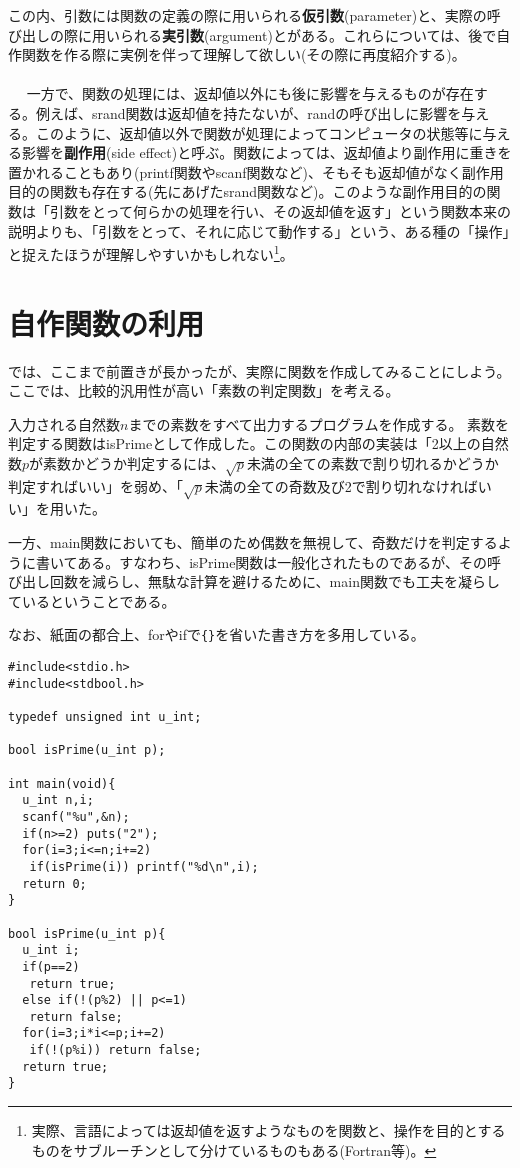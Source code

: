 この内、引数には関数の定義の際に用いられる\textbf{仮引数}(parameter)と、実際の呼び出しの際に用いられる\textbf{実引数}(argument)とがある。これらについては、後で自作関数を作る際に実例を伴って理解して欲しい(その際に再度紹介する)。
\\ \\　
一方で、関数の処理には、返却値以外にも後に影響を与えるものが存在する。例えば、srand関数は返却値を持たないが、randの呼び出しに影響を与える。このように、返却値以外で関数が処理によってコンピュータの状態等に与える影響を\textbf{副作用}(side effect)と呼ぶ。関数によっては、返却値より副作用に重きを置かれることもあり(printf関数やscanf関数など)、そもそも返却値がなく副作用目的の関数も存在する(先にあげたsrand関数など)。このような副作用目的の関数は「引数をとって何らかの処理を行い、その返却値を返す」という関数本来の説明よりも、「引数をとって、それに応じて動作する」という、ある種の「操作」と捉えたほうが理解しやすいかもしれない\footnote{実際、言語によっては返却値を返すようなものを関数と、操作を目的とするものをサブルーチンとして分けているものもある(Fortran等)。}。

\section{自作関数の利用}
では、ここまで前置きが長かったが、実際に関数を作成してみることにしよう。ここでは、比較的汎用性が高い「素数の判定関数」を考える。
\begin{boxnote}
\begin{multicols}{2}
入力される自然数$n$までの素数をすべて出力するプログラムを作成する。
素数を判定する関数はisPrimeとして作成した。この関数の内部の実装は「2以上の自然数$p$が素数かどうか判定するには、$\sqrt{p}$未満の全ての素数で割り切れるかどうか判定すればいい」を弱め、「$\sqrt{p}$未満の全ての奇数及び2で割り切れなければいい」を用いた。

一方、main関数においても、簡単のため偶数を無視して、奇数だけを判定するように書いてある。すなわち、isPrime関数は一般化されたものであるが、その呼び出し回数を減らし、無駄な計算を避けるために、main関数でも工夫を凝らしているということである。

なお、紙面の都合上、forやifで\verb|{}|を省いた書き方を多用している。

\begin{lstlisting}[caption=素数の判定,label=program6_1]
#include<stdio.h>
#include<stdbool.h>

typedef unsigned int u_int;

bool isPrime(u_int p);

int main(void){
  u_int n,i;
  scanf("%u",&n);
  if(n>=2) puts("2");
  for(i=3;i<=n;i+=2)
   if(isPrime(i)) printf("%d\n",i);
  return 0;
}

bool isPrime(u_int p){
  u_int i;
  if(p==2)
   return true;
  else if(!(p%2) || p<=1)
   return false;
  for(i=3;i*i<=p;i+=2)
   if(!(p%i)) return false;
  return true;
}
\end{lstlisting}
\end{multicols}
\end{boxnote}

